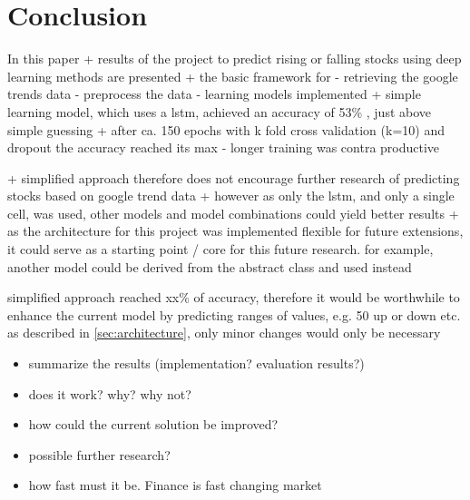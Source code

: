 \section{Conclusion}
\label{sec:ausblick}
In this paper 
+ results of the project to predict rising or falling stocks using deep learning methods are presented
+ the basic framework for
	- retrieving the google trends data
	- preprocess the data
	- learning models
	implemented
+ simple learning model, which uses a lstm, achieved an accuracy of 53\% , just above simple guessing 
+ after ca. 150 epochs with k fold cross validation (k=10) and dropout the accuracy reached its max - longer training was contra productive 

+ simplified approach therefore does not encourage further research of predicting stocks based on google trend data
+ however as only the lstm, and only a single cell, was used, other models and model combinations could yield better results
+ as the architecture for this project was implemented flexible for future extensions, it could serve as a starting point / core for this future research. for example, another model could be derived from the abstract class and used instead

simplified approach reached xx\% of accuracy, therefore it would be worthwhile to enhance the current model by predicting ranges of values, e.g. 50 up or down etc.
as described in \ref{sec:architecture}, only minor changes would only be necessary
\begin{itemize}
	\item summarize the results (implementation? evaluation results?) 
	\item does it work? why? why not? 
	\item how could the current solution be improved? 
	\item possible further research? 
	\item how fast must it be. Finance is fast changing market
\end{itemize}